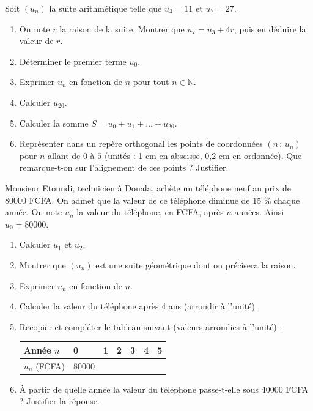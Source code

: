 \documentclass[11pt]{article}
\begin{document}
\begin{exercice}
Soit $(u_n)$ la suite arithmétique telle que $u_3 = 11$ et $u_7 = 27$.
\begin{enumerate}
\item On note $r$ la raison de la suite. Montrer que $u_7 = u_3 + 4r$, puis en déduire la valeur de $r$.
\item Déterminer le premier terme $u_0$.
\item Exprimer $u_n$ en fonction de $n$ pour tout $n \in \mathbb{N}$.
\item Calculer $u_{20}$.
\item Calculer la somme $S = u_0 + u_1 + \dots + u_{20}$.
\item Représenter dans un repère orthogonal les points de coordonnées $(n\,;\,u_n)$ pour $n$ allant de $0$ à $5$ (unités : 1 cm en abscisse, 0,2 cm en ordonnée). Que remarque-t-on sur l'alignement de ces points ? Justifier.
\end{enumerate}
\end{exercice}

\begin{exercice}
Monsieur Etoundi, technicien à Douala, achète un téléphone neuf au prix de \num{80000} FCFA. On admet que la valeur de ce téléphone diminue de 15 \% chaque année. On note $u_n$ la valeur du téléphone, en FCFA, après $n$ années. Ainsi $u_0 = \num{80000}$.
\begin{enumerate}
\item Calculer $u_1$ et $u_2$.
\item Montrer que $(u_n)$ est une suite géométrique dont on précisera la raison.
\item Exprimer $u_n$ en fonction de $n$.
\item Calculer la valeur du téléphone après 4 ans (arrondir à l'unité).
\item Recopier et compléter le tableau suivant (valeurs arrondies à l'unité) :
\begin{center}
\begin{tabularx}{\linewidth}{|l|X|X|X|X|X|X|}\hline
Année $n$ & 0 & 1 & 2 & 3 & 4 & 5 \\ \hline
$u_n$ (FCFA) & \num{80000} & & & & & \\ \hline
\end{tabularx}
\end{center}
\item À partir de quelle année la valeur du téléphone passe-t-elle sous \num{40000} FCFA ? Justifier la réponse.
\end{enumerate}
\end{exercice}
\end{document}
